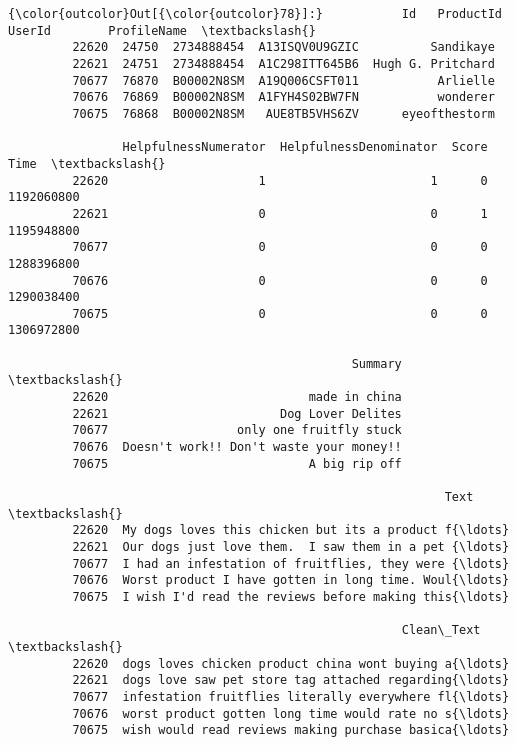 \documentclass[11pt]{article}
\begin{document}
\begin{Verbatim}[commandchars=\\\{\}]
{\color{outcolor}Out[{\color{outcolor}78}]:}           Id   ProductId          UserId        ProfileName  \textbackslash{}
         22620  24750  2734888454  A13ISQV0U9GZIC          Sandikaye   
         22621  24751  2734888454  A1C298ITT645B6  Hugh G. Pritchard   
         70677  76870  B00002N8SM  A19Q006CSFT011           Arlielle   
         70676  76869  B00002N8SM  A1FYH4S02BW7FN           wonderer   
         70675  76868  B00002N8SM   AUE8TB5VHS6ZV      eyeofthestorm   
         
                HelpfulnessNumerator  HelpfulnessDenominator  Score        Time  \textbackslash{}
         22620                     1                       1      0  1192060800   
         22621                     0                       0      1  1195948800   
         70677                     0                       0      0  1288396800   
         70676                     0                       0      0  1290038400   
         70675                     0                       0      0  1306972800   
         
                                                Summary  \textbackslash{}
         22620                            made in china   
         22621                        Dog Lover Delites   
         70677                  only one fruitfly stuck   
         70676  Doesn't work!! Don't waste your money!!   
         70675                            A big rip off   
         
                                                             Text  \textbackslash{}
         22620  My dogs loves this chicken but its a product f{\ldots}   
         22621  Our dogs just love them.  I saw them in a pet {\ldots}   
         70677  I had an infestation of fruitflies, they were {\ldots}   
         70676  Worst product I have gotten in long time. Woul{\ldots}   
         70675  I wish I'd read the reviews before making this{\ldots}   
         
                                                       Clean\_Text  \textbackslash{}
         22620  dogs loves chicken product china wont buying a{\ldots}   
         22621  dogs love saw pet store tag attached regarding{\ldots}   
         70677  infestation fruitflies literally everywhere fl{\ldots}   
         70676  worst product gotten long time would rate no s{\ldots}   
         70675  wish would read reviews making purchase basica{\ldots}   
         

\end{Verbatim}
\end{document}
